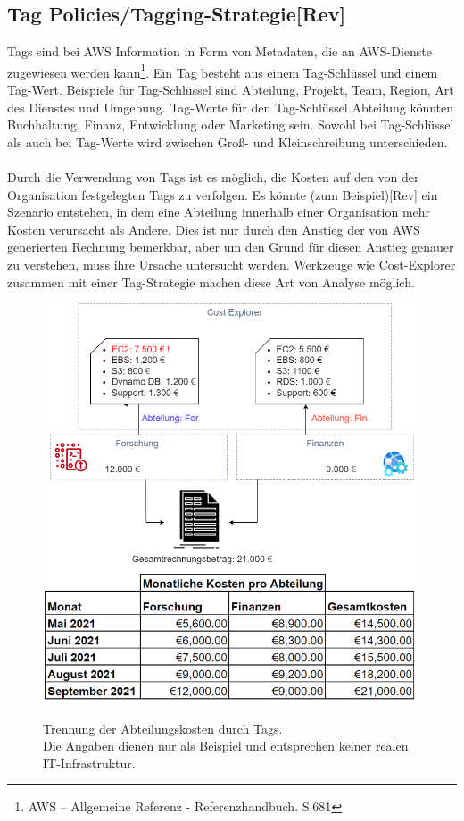 \subsection*{Tag Policies/Tagging-Strategie[Rev]}
Tags sind bei AWS Information in Form von Metadaten, die an AWS-Dienste zugewiesen werden kann\footnote{AWS – Allgemeine Referenz - Referenzhandbuch. S.681\cite{AMZ29}}. Ein Tag besteht aus einem Tag-Schlüssel und einem Tag-Wert. Beispiele für Tag-Schlüssel sind Abteilung, Projekt, Team, Region, Art des Dienstes und Umgebung. Tag-Werte für den Tag-Schlüssel Abteilung könnten Buchhaltung, Finanz, Entwicklung oder Marketing sein. Sowohl bei Tag-Schlüssel als auch bei Tag-Werte wird zwischen Groß- und Kleinschreibung unterschieden. 
\\\\
Durch die Verwendung von Tags ist es möglich, die Kosten auf den von der Organisation festgelegten Tags zu verfolgen. Es könnte (zum Beispiel)[Rev] ein Szenario entstehen, in dem eine Abteilung innerhalb einer Organisation mehr Kosten verursacht als Andere. Dies ist nur durch den Anstieg der von AWS generierten Rechnung bemerkbar, aber um den Grund für diesen Anstieg genauer zu verstehen, muss ihre Ursache untersucht werden. Werkzeuge wie Cost-Explorer zusammen mit einer Tag-Strategie machen diese Art von Analyse möglich.
\begin{figure}[h!]
  \centering
  \includegraphics[scale=0.5]{sources/BA Diagramme-Nach Abteilung.drawio}
  \caption[Trennung der Kosten durch Tags]{}
  \label{fig:BA Diagramme-Nach Abteilung.drawio} 
  Trennung der Abteilungskosten durch Tags.\\
  Die Angaben dienen nur als Beispiel und entsprechen keiner realen IT-Infrastruktur.
\end{figure} 
